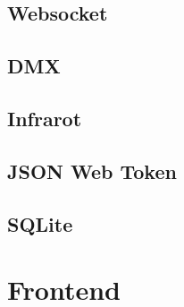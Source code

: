 \documentclass[
    headings=optiontotocandhead,%
    twoside,
    numbers=noenddot,%
    toc=flat, %
    12pt, %
    titlepage, %
    parskip=full, %
    listof=totoc, %
    listof=flat, %
    numbers=noenddot, %
    bibliography=totoc, %
    a4paper,DIV=14,
    BCOR=15mm,
]{scrbook}
\begin{document}
\renewcommand{\kapitelautor}{Autor: Clemens Scharwitzl}



\section{Websocket}\label{Websocket}

\renewcommand{\kapitelautor}{Autor: Clemens Scharwitzl}

    

\section{DMX}\label{DMX}

\renewcommand{\kapitelautor}{Autor: Clemens Scharwitzl}

    

\section{Infrarot}\label{Infrarot}

\renewcommand{\kapitelautor}{Autor: Clemens Scharwitzl}

    

\section{JSON Web Token}\label{JWT}

\renewcommand{\kapitelautor}{Autor: Clemens Scharwitzl}

    

\section{SQLite}\label{SQLite}

\renewcommand{\kapitelautor}{Autor: Clemens Scharwitzl}

    

\chapter{Frontend}\label{Frontend}

\renewcommand{\kapitelautor}{Autor: Dominik Nußbaumer}
\end{document}

